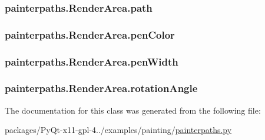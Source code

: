 \subsubsection[{path}]{\setlength{\rightskip}{0pt plus 5cm}painterpaths.\+Render\+Area.\+path}\label{classpainterpaths_1_1RenderArea_a734166fddb2cba889a63afbe8ab22f9b}
\hypertarget{classpainterpaths_1_1RenderArea_af857d4cee9af71f7893bea2128a463f7}{}
\subsubsection[{pen\+Color}]{\setlength{\rightskip}{0pt plus 5cm}painterpaths.\+Render\+Area.\+pen\+Color}\label{classpainterpaths_1_1RenderArea_af857d4cee9af71f7893bea2128a463f7}
\hypertarget{classpainterpaths_1_1RenderArea_af886673d959a044eb4ad8fa2ff3dedcc}{}
\subsubsection[{pen\+Width}]{\setlength{\rightskip}{0pt plus 5cm}painterpaths.\+Render\+Area.\+pen\+Width}\label{classpainterpaths_1_1RenderArea_af886673d959a044eb4ad8fa2ff3dedcc}
\hypertarget{classpainterpaths_1_1RenderArea_a08327350009aa74d87523cfefeb491d3}{}
\subsubsection[{rotation\+Angle}]{\setlength{\rightskip}{0pt plus 5cm}painterpaths.\+Render\+Area.\+rotation\+Angle}\label{classpainterpaths_1_1RenderArea_a08327350009aa74d87523cfefeb491d3}


The documentation for this class was generated from the following file\+:\begin{DoxyCompactItemize}
\item 
packages/\+Py\+Qt-\/x11-\/gpl-\/4../examples/painting/\hyperlink{painterpaths_8py}{painterpaths.\+py}\end{DoxyCompactItemize}
